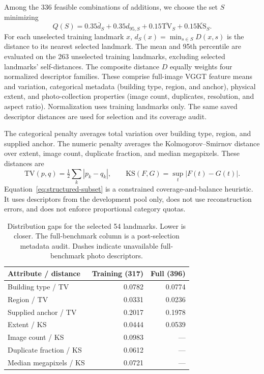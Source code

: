 Among the 336 feasible combinations of additions, we choose the set $S$ minimizing
\begin{equation}
 Q(S)=0.35\bar d_S+0.35d_{95,S}
       +0.15\overline{\mathrm{TV}}_S+0.15\overline{\mathrm{KS}}_S.
 \label{eq:structured-subset}
\end{equation}
For each unselected training landmark $x$, $d_S(x)=\min_{s\in S}D(x,s)$ is the distance to its nearest selected landmark. The mean and 95th percentile are evaluated on the 263 unselected training landmarks, excluding selected landmarks' self-distances. The composite distance $D$ equally weights four normalized descriptor families. These comprise full-image VGGT feature means and variation, categorical metadata (building type, region, and anchor), physical extent, and photo-collection properties (image count, duplicates, resolution, and aspect ratio). Normalization uses training landmarks only. The same saved descriptor distances are used for selection and its coverage audit.

The categorical penalty averages total variation over building type, region, and supplied anchor. The numeric penalty averages the Kolmogorov--Smirnov distance over extent, image count, duplicate fraction, and median megapixels. These distances are
\begin{equation}
\mathrm{TV}(p,q)=\tfrac12\sum_k|p_k-q_k|,\qquad
\mathrm{KS}(F,G)=\sup_t|F(t)-G(t)|.
\end{equation}
Equation~\ref{eq:structured-subset} is a constrained coverage-and-balance heuristic. It uses descriptors from the development pool only, does not use reconstruction errors, and does not enforce proportional category quotas.

\begin{table}[t]
\caption{Distribution gaps for the selected 54 landmarks. Lower is closer. The full-benchmark column is a post-selection metadata audit. Dashes indicate unavailable full-benchmark photo descriptors.}
\label{tab:structured-subset}
\centering
\begin{tabular}{lrr}
\toprule
Attribute / distance & Training (317) & Full (396)\\
\midrule
Building type / TV & 0.0782 & 0.0774\\
Region / TV & 0.0331 & 0.0236\\
Supplied anchor / TV & 0.2017 & 0.1978\\
Extent / KS & 0.0444 & 0.0539\\
Image count / KS & 0.0983 & ---\\
Duplicate fraction / KS & 0.0612 & ---\\
Median megapixels / KS & 0.0721 & ---\\
\bottomrule
\end{tabular}
\end{table}

